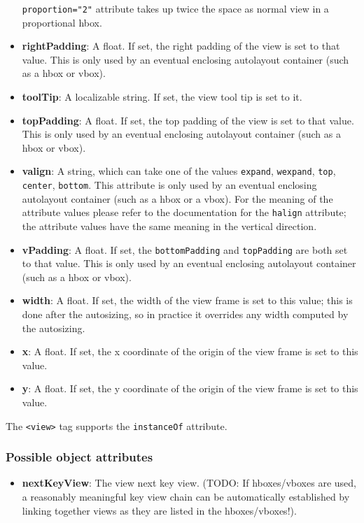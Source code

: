 \begin{itemize}
  \texttt{proportion="2"} attribute takes up twice the space as normal
  view in a proportional hbox.
\item {\bf rightPadding}: A float.  If set, the right padding of the
  view is set to that value.  This is only used by an eventual
  enclosing autolayout container (such as a hbox or vbox).
\item {\bf toolTip}: A localizable string.  If set, the view tool tip
  is set to it.
\item {\bf topPadding}: A float.  If set, the top padding of the view
  is set to that value.  This is only used by an eventual enclosing
  autolayout container (such as a hbox or vbox).
\item {\bf valign}: A string, which can take one of the values
  \texttt{expand}, \texttt{wexpand}, \texttt{top}, \texttt{center},
  \texttt{bottom}.  This attribute is only used by an eventual
  enclosing autolayout container (such as a hbox or a vbox).  For the
  meaning of the attribute values please refer to the documentation
  for the \texttt{halign} attribute; the attribute values have the
  same meaning in the vertical direction.
\item {\bf vPadding}: A float.  If set, the \texttt{bottomPadding} and
  \texttt{topPadding} are both set to that value.  This is only used
  by an eventual enclosing autolayout container (such as a hbox or
  vbox).
\item {\bf width}: A float.  If set, the width of the view frame is
  set to this value; this is done after the autosizing, so in practice
  it overrides any width computed by the autosizing.
\item {\bf x}: A float.  If set, the x coordinate of the origin of the
  view frame is set to this value.
\item {\bf y}: A float.  If set, the y coordinate of the origin of the
  view frame is set to this value.
\end{itemize}

The \texttt{<view>} tag supports the \texttt{instanceOf} attribute.

\subsubsection{Possible object attributes}
\begin{itemize}
\item {\bf nextKeyView}: The view next key view.  (TODO: If
  hboxes/vboxes are used, a reasonably meaningful key view chain can
  be automatically established by linking together views as they are
  listed in the hboxes/vboxes!).
\end{itemize}

